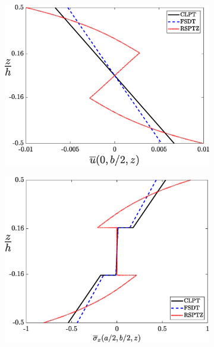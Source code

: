 \documentclass{article}
\begin{document}
\begin{figure}[!]
        \begin{subfigure}{0.5\textwidth}
            \includegraphics[width=1\linewidth, height=0.8\linewidth]{figures/u_bar.eps} 
            \caption{}
            \label{fig:u_bar}
        \end{subfigure}
        \begin{subfigure}{0.5\textwidth}
            \includegraphics[width=1\linewidth, height=0.8\linewidth]{figures/sigma__xx_bar.eps} 
            \caption{}
            \label{fig:sigma__xx_bar}
        \end{subfigure}


\end{figure}
\end{document}
